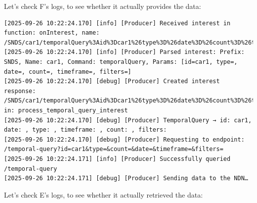 \documentclass{article}
\begin{document}
Let's check F's logs, to see whether it actually provides the data: 

\begin{lstlisting}[language=log, caption={F logs should now provide the data originally provided through B}, label={lst:f-after-failure-provides}]
[2025-09-26 10:22:24.170] [info] [Producer] Received interest in function: onInterest, name: /SNDS/car1/temporalQuery%3Aid%3Dcar1%26type%3D%26date%3D%26count%3D%26timeframe%3D%26filters%3D
[2025-09-26 10:22:24.170] [info] [Producer] Parsed interest: Prefix: SNDS, Name: car1, Command: temporalQuery, Params: [id=car1, type=, date=, count=, timeframe=, filters=]
[2025-09-26 10:22:24.170] [debug] [Producer] Created interest response: /SNDS/car1/temporalQuery%3Aid%3Dcar1%26type%3D%26date%3D%26count%3D%26timeframe%3D%26filters%3D in: process_temporal_query_interest
[2025-09-26 10:22:24.170] [debug] [Producer] TemporalQuery → id: car1, date: , type: , timeframe: , count: , filters: 
[2025-09-26 10:22:24.170] [debug] [Producer] Requesting to endpoint: /temporal-query?id=car1&type=&count=&date=&timeframe=&filters=
[2025-09-26 10:22:24.171] [info] [Producer] Successfully queried /temporal-query
[2025-09-26 10:22:24.171] [debug] [Producer] Sending data to the NDN…
\end{lstlisting}

Let's check E's logs, to see whether it actually retrieved the data: 
\end{document}
